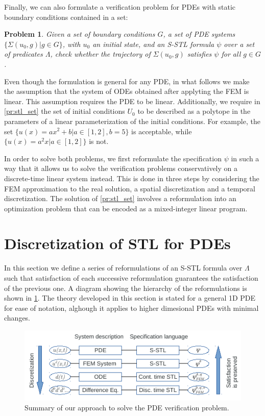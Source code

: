 \documentclass[letterpaper, 10 pt, conference]{ieeeconf/ieeeconf}
\newtheorem{problem}{Problem}
\begin{document}
Finally, we can also formulate a verification problem for PDEs with static
boundary conditions contained in a set:

\begin{problem}
\label{pr:stl_bound_set}
    Given a set of boundary conditions $G$, a set of PDE systems
    $\{\Sigma(u_0, g) | g \in G\}$, with $u_0$
    an initial state, and an S-STL formula $\psi$ over a set of
    predicates $\Lambda$, check whether the trajectory of $\Sigma(u_0, g)$
    satisfies $\psi$ for all $g \in G$.
\end{problem}

Even though the formulation is general for any PDE, in what follows we make the
assumption that the system of ODEs obtained after applyting the FEM is linear.
This assumption requires the PDE
to be linear. Additionally, we require in \cref{pr:stl_set} the set of initial
conditions $U_0$ to be described as a polytope in the parameters of a
linear parameterization of the initial conditions. For example, the set $\{u(x)
= a x^2 + b | a \in [1,2], b = 5\}$ is acceptable, while $\{u(x) = a^2 x |
a \in [1,2]\}$ is not.

In order to solve both problems, we first reformulate the specification $\psi$
in such a way that it allows us to solve the verification problems
conservatively on a discrete-time linear system instead. This is done in three
steps by considering the FEM approximation to the real solution, a spatial
discretization and a temporal discretization. The solution of \cref{pr:stl_set}
involves a reformulation into an optimization problem that can be encoded as a
mixed-integer linear program.

\section{Discretization of STL for PDEs}
\label{sec:formally_correct_discretization_of_pdestl}

In this section we define a series of reformulations of an S-STL formula over
$\Lambda$ such that satisfaction of each successive reformulation guarantees the
satisfaction of the previous one. A diagram showing the hierarchy of the
reformulations is shown in \cref{fig:diagram}. The theory developed in this section is stated
for a general 1D PDE for ease of notation, alghough it applies to higher dimesional PDEs
with minimal changes.

\begin{figure}[!t]
    \centering 
    \includegraphics[width=0.99\columnwidth]{diagram.png}
    \caption{Summary of our approach to solve the PDE verification problem.}
    \label{fig:diagram}
\end{figure}
\end{document}
